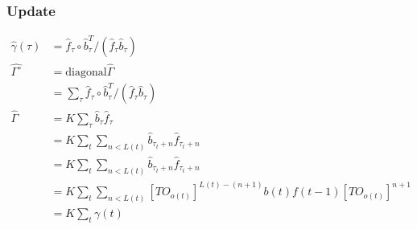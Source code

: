 \documentclass{article}
\begin{document}
  \subsubsection{Update}
  \begin{align*}
    \hat{\gamma}(\tau) &= \hat{f}_{\tau} \circ \hat{b}_{\tau}^T/(\hat{f}_{\tau}\hat{b}_{\tau})\\
    \hat{\Gamma^\circ} &= \text{diagonal}{\hat\Gamma}\\
&= \sum_\tau \hat{f}_{\tau} \circ \hat{b}_{\tau}^T/(\hat{f}_{\tau}\hat{b}_{\tau})\\
    \hat{\Gamma} &= K \sum_\tau \hat{b}_{\tau}\hat{f}_{\tau}\\
    &= K \sum_t \sum_{n<L(t)} \hat{b}_{\tau_t+n} \hat{f}_{\tau_t+n}\\
    &= K\sum_t \sum_{n<L(t)}  \hat{b}_{\tau_t+n}\hat{f}_{\tau_t+n}\\
    &= K\sum_t \sum_{n<L(t)} \left[TO_{o(t)}\right]^{L(t)-(n+1)}b(t)f(t-1)\left[TO_{o(t)}\right]^{n+1}\\
    &= K\sum_t \gamma(t)\\
  \end{align*}
\end{document}
